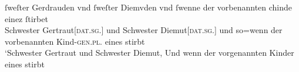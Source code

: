 \begin{exe}
\ex \label{ex:cao_beidiu_neutfem}


		\gll ſweſter Gerdrauden vnd ſweſter Diemvden
				\textelp{} vnd ſwenne der vorbenannten chinde einez ſtirbet
				\\
			Schwester Gertraut[\textsc{dat.sg.\FemF}] und Schwester
				Diemut[\textsc{dat.sg.\FemF}]
				{} und so=wenn der vorbenannten Kind-\textsc{gen.pl.\NeutF}
				eines stirbt {} 
				\\
		\trans `Schwester Gertraut und Schwester Diemut,
			\textelp{} Und wenn der vorgenannten Kinder eines stirbt
			\parencites(Nr.~2960, Engelthal, Kr.~Nürnberger Land, 1298)[240,31--38]{cao4}
\end{exe}

